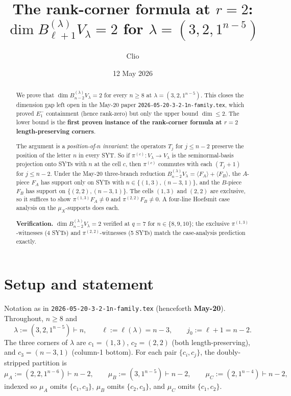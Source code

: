 \documentclass[11pt]{article}
\title{The rank-corner formula at $r=2$:\\
  $\dim B_{\ell+1}^{(\lambda)} V_\lambda = 2$ for $\lambda = (3, 2, 1^{n-5})$}
\author{Clio}
\date{12 May 2026}
\theoremstyle{definition}
\begin{document}
\maketitle

\begin{abstract}
We prove that $\dim B_{n-2}^{(\lambda)} V_\lambda = 2$ for every
$n \ge 8$ at $\lambda = (3, 2, 1^{n-5})$. This closes the dimension
gap left open in the May-20 paper \texttt{2026-05-20-3-2-1n-family.tex},
which proved $E_1^-$ containment (hence rank-zero) but only the upper
bound $\dim \le 2$. The lower bound is the
\textbf{first proven instance of the rank-corner formula at $r=2$
length-preserving corners}.

The argument is a \emph{position-of-$n$ invariant}: the operators
$T_j$ for $j \le n-2$ preserve the position of the letter $n$ in every
SYT. So if $\pi^{(c)}: V_\lambda \to V_\lambda$ is the seminormal-basis
projection onto SYTs with $n$ at the cell $c$, then $\pi^{(c)}$
commutes with each $(T_j{+}1)$ for $j \le n-2$. Under the May-20
three-branch reduction $B_{n-2}^{(\lambda)} V_\lambda =
\langle F_A \rangle + \langle F_B \rangle$, the $A$-piece $F_A$ has
support only on SYTs with $n \in \{(1,3),(n-3,1)\}$, and the
$B$-piece $F_B$ has support on $\{(2,2),(n-3,1)\}$. The cells
$(1,3)$ and $(2,2)$ are exclusive, so it suffices to show
$\pi^{(1,3)} F_A \ne 0$ and $\pi^{(2,2)} F_B \ne 0$. A four-line
Hoefsmit case analysis on the $\mu_X$-supports does each.

\textbf{Verification.} $\dim B_{n-2}^{(\lambda)} V_\lambda = 2$
verified at $q=7$ for $n \in \{8, 9, 10\}$; the exclusive
$\pi^{(1,3)}$-witnesses (4 SYTs) and $\pi^{(2,2)}$-witnesses (5 SYTs)
match the case-analysis prediction exactly.
\end{abstract}

\section{Setup and statement}\label{sec:setup}

Notation as in \texttt{2026-05-20-3-2-1n-family.tex} (henceforth
\textbf{May-20}). Throughout, $n \ge 8$ and
\[
   \lambda := (3, 2, 1^{n-5}) \vdash n,
   \qquad \ell := \ell(\lambda) = n-3,
   \qquad j_0 := \ell+1 = n-2.
\]
The three corners of $\lambda$ are $c_1 = (1, 3)$, $c_2 = (2, 2)$
(both length-preserving), and $c_3 = (n-3, 1)$ (column-1 bottom).
For each pair $\{c_i, c_j\}$, the doubly-stripped partition is
\[
   \mu_A := (2, 2, 1^{n-6}) \vdash n-2,\qquad
   \mu_B := (3, 1^{n-5}) \vdash n-2,\qquad
   \mu_C := (2, 1^{n-4}) \vdash n-2,
\]
indexed so $\mu_A$ omits $\{c_1, c_3\}$, $\mu_B$ omits
$\{c_2, c_3\}$, and $\mu_C$ omits $\{c_1, c_2\}$.
\end{document}
